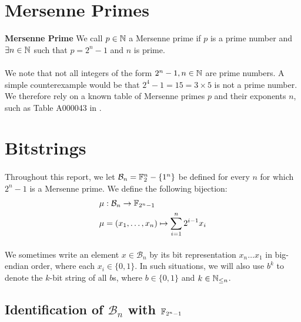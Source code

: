 \section{Mersenne Primes}
\theoremstyle{definition}
\begin{definition}{\textbf{Mersenne Prime}}
We call $p \in \mathbb{N}$ a Mersenne prime if $p$ is a prime number and $\exists n \in \mathbb{N}$ such that $p = 2^n - 1$ and $n$ is prime.
\end{definition}

\paragraph{}
We note that not all integers of the form $2^n -1, n \in \mathbb{N}$ are prime numbers. A simple counterexample would be that $2^4 - 1 = 15 = 3 \times 5$ is not a prime number. We therefore rely on a known table of Mersenne primes $p$ and their exponents $n$, such as Table A000043 in \cite{sloane2008line}.

\section{Bitstrings}

\paragraph{}
Throughout this report, we let $\mathcal{B}_n = \mathbb{F}_2^n - \{1^n\}$ be defined for every $n$ for which $2^n -1$ is a Mersenne prime. We define the following bijection:
\begin{align*}
    \mu &: \mathcal{B}_n \rightarrow \mathbb{F}_{2^n-1}\\
    \mu &= (x_1, \dots, x_n) \mapsto \sum_{i=1}^n 2^{i-1} x_i
\end{align*}

\paragraph{}
We sometimes write an element $x \in \mathcal{B}_n$ by its bit representation $x_n \dots x_1$ in big-endian order, where each $x_i \in \{0, 1\}$. In such situations, we will also use $b^k$ to denote the $k$-bit string of all $b$s, where $b \in \{0, 1\}$ and $k \in \mathbb{N}_{\leq n}$.

\subsection{Identification of $\mathcal{B}_n$ with $\mathbb{F}_{2^n -1}$}

